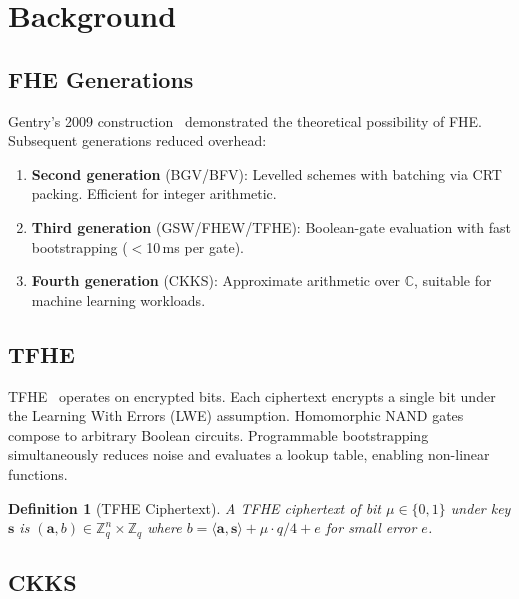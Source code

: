 \documentclass[11pt,a4paper]{article}
\newtheorem{definition}{Definition}[section]
\begin{document}
\section{Background}
\label{sec:background}

\subsection{FHE Generations}

Gentry's 2009 construction~\cite{gentry2009fhe} demonstrated the
theoretical possibility of FHE.  Subsequent generations reduced overhead:

\begin{enumerate}
    \item \textbf{Second generation} (BGV/BFV): Levelled schemes with
    batching via CRT packing.  Efficient for integer arithmetic.
    \item \textbf{Third generation} (GSW/FHEW/TFHE): Boolean-gate
    evaluation with fast bootstrapping ($<$10\,ms per gate).
    \item \textbf{Fourth generation} (CKKS): Approximate arithmetic over
    $\mathbb{C}$, suitable for machine learning workloads.
\end{enumerate}

\subsection{TFHE}

TFHE~\cite{chillotti2020tfhe} operates on encrypted bits.  Each ciphertext
encrypts a single bit under the Learning With Errors (LWE) assumption.
Homomorphic NAND gates compose to arbitrary Boolean circuits.
Programmable bootstrapping simultaneously reduces noise and evaluates a
lookup table, enabling non-linear functions.

\begin{definition}[TFHE Ciphertext]
    A TFHE ciphertext of bit $\mu \in \{0,1\}$ under key $\mathbf{s}$ is
    $(\mathbf{a}, b) \in \mathbb{Z}_q^n \times \mathbb{Z}_q$ where
    $b = \langle \mathbf{a}, \mathbf{s} \rangle + \mu \cdot q/4 + e$
    for small error $e$.
\end{definition}

\subsection{CKKS}
\end{document}
